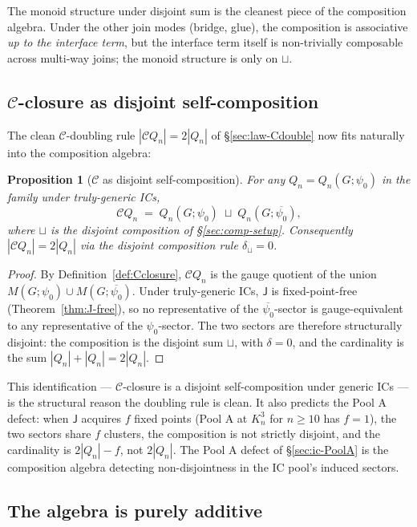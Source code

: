 \documentclass[12pt,a4paper]{article}
\newtheorem{proposition}[theorem]{Proposition}
\theoremstyle{definition}
\theoremstyle{remark}
\newcommand{\Kn}{K_n^3}
\newcommand{\Qn}{Q_n}
\newcommand{\Ccls}{\mathcal{C}}             %
\newcommand{\Jconj}{\mathsf{J}}             %
\begin{document}
The monoid structure under disjoint sum is the cleanest piece of the
composition algebra. Under the other join modes (bridge, glue), the
composition is associative \emph{up to the interface term}, but the
interface term itself is non-trivially composable across multi-way
joins; the monoid structure is only on $\sqcup$.

\subsection{$\Ccls$-closure as disjoint self-composition}
\label{sec:comp-Cclosure}

The clean $\Ccls$-doubling rule $|\Ccls\Qn| = 2|\Qn|$ of
\S\ref{sec:law-Cdouble} now fits naturally into the composition
algebra:

\begin{proposition}[$\Ccls$ as disjoint self-composition]
\label{prop:C-as-disjoint}
For any $\Qn = \Qn(G; \psi_0)$ in the family under truly-generic ICs,
\[
\Ccls\Qn \;=\; \Qn(G; \psi_0) \;\sqcup\; \Qn(G; \overline{\psi_0}),
\]
where $\sqcup$ is the disjoint composition of
\S\ref{sec:comp-setup}. Consequently $|\Ccls\Qn| = 2 |\Qn|$ via the
disjoint composition rule $\delta_{\sqcup} = 0$.
\end{proposition}

\begin{proof}
By Definition~\ref{def:Cclosure}, $\Ccls\Qn$ is the gauge quotient
of the union $M(G; \psi_0) \cup M(G; \overline{\psi_0})$. Under
truly-generic ICs, $\Jconj$ is fixed-point-free
(Theorem~\ref{thm:J-free}), so no representative of the
$\overline{\psi_0}$-sector is gauge-equivalent to any representative
of the $\psi_0$-sector. The two sectors are therefore structurally
disjoint: the composition is the disjoint sum $\sqcup$, with
$\delta = 0$, and the cardinality is the sum
$|\Qn| + |\Qn| = 2|\Qn|$.
\end{proof}

This identification --- $\Ccls$-closure is a disjoint self-composition
under generic ICs --- is the structural reason the doubling rule is
clean. It also predicts the Pool A defect: when $\Jconj$ acquires
$f$ fixed points (Pool A at $\Kn$ for $n \ge 10$ has $f = 1$), the
two sectors share $f$ clusters, the composition is not strictly
disjoint, and the cardinality is $2|\Qn| - f$, not $2|\Qn|$. The
Pool A defect of \S\ref{sec:ic-PoolA} is the composition algebra
detecting non-disjointness in the IC pool's induced sectors.

\subsection{The algebra is purely additive}\label{sec:comp-additive}
\end{document}
